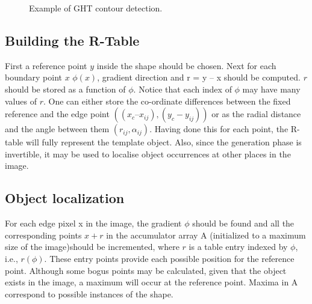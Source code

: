 \documentclass[letterpaper,12pt]{article}
\begin{document}
\begin{figure}[h]
  \centering
  \hfill
  \caption{Example of GHT contour detection.}
\end{figure}

\subsection{Building the R-Table}

First a reference point $y$ inside the shape should be chosen. Next for each boundary point $x$ $\phi(x)$, gradient direction and r = y – x should be computed. $r$ should be stored as a function of $\phi$. Notice that each index of $\phi$ may have many values of $r$. One can either store the co-ordinate differences between the fixed reference and the edge point $((x_c – x_{ij}),( y_c - y_{ij}))$ or as the radial distance and the angle between them $(r_{ij} , \alpha_{ij})$. Having done this for each point, the R-table will fully represent the template object. Also, since the generation phase is invertible, it may be used to localise object occurrences at other places in the image.


\subsection{Object localization}

For each edge pixel x in the image, the gradient $\phi$  should be found and all the corresponding points $x+r$ in the accumulator array A (initialized to a maximum size of the image)should be incremented, where $r$ is a table entry indexed by $\phi$, i.e., $r(\phi)$. These entry points provide each possible position for the reference point. Although some bogus points may be calculated, given that the object exists in the image, a maximum will occur at the reference point. Maxima in A correspond to possible instances of the shape.
\end{document}
